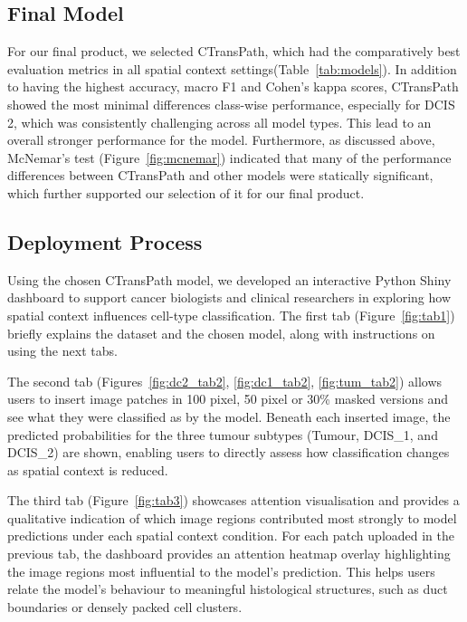 \documentclass[11pt,a4paper]{article}
\begin{document}
\subsection{Final Model}
For our final product, we selected CTransPath, which had the comparatively best evaluation metrics in all spatial context settings(Table~\ref{tab:models}). In addition to having the highest accuracy, macro F1 and Cohen's kappa scores, CTransPath showed the most minimal differences class-wise performance, especially for DCIS 2, which was consistently challenging across all model types. This lead to an overall stronger performance for the model. Furthermore, as discussed above, McNemar's test (Figure~\ref{fig:mcnemar}) indicated that many of the performance differences between CTransPath and other models were statically significant, which further supported our selection of it for our final product.

\subsection{Deployment Process}

Using the chosen CTransPath model, we developed an interactive Python Shiny dashboard to support cancer biologists and clinical researchers in exploring how spatial context influences cell-type classification. The first tab (Figure~\ref{fig:tab1}) briefly explains the dataset and the chosen model, along with instructions on using the next tabs. 

The second tab (Figures~\ref{fig:dc2_tab2}, \ref{fig:dc1_tab2}, \ref{fig:tum_tab2}) allows users to insert image patches in 100 pixel, 50 pixel or 30\% masked versions and see what they were classified as by the model. Beneath each inserted image, the predicted probabilities for the three tumour subtypes (Tumour, DCIS\_1, and DCIS\_2) are shown, enabling users to directly assess how classification changes as spatial context is reduced. 

The third tab (Figure~\ref{fig:tab3}) showcases attention visualisation and provides a qualitative indication of which image regions contributed most strongly to model predictions under each spatial context condition. For each patch uploaded in the previous tab, the dashboard provides an attention heatmap overlay highlighting the image regions most influential to the model’s prediction. This helps users relate the model’s behaviour to meaningful histological structures, such as duct boundaries or densely packed cell clusters.
\end{document}
